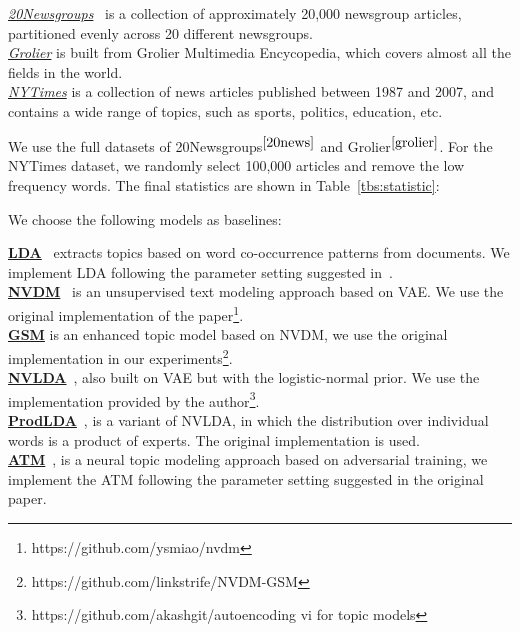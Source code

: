 \documentclass[11pt,a4paper]{article}
\begin{document}
\noindent\emph{\underline{20Newsgroups}}~\cite{Lang95} is a collection of approximately 20,000 newsgroup articles, partitioned evenly across 20 different newsgroups.  \\
\noindent\underline{\emph{Grolier}} is built from Grolier Multimedia Encycopedia, which covers almost all the fields in the world.\\
\noindent\underline{\emph{NYTimes}} is a collection of news articles published between 1987 and 2007, and contains a wide range of topics, such as sports, politics, education, etc.

We use the full datasets of 20Newsgroups$^{\ref{20news}}$ and Grolier$^{\ref{grolier}}$. For the NYTimes dataset, we randomly select 100,000 articles and remove the low frequency words. The final statistics are shown in Table~\ref{tbs:statistic}:

\begin{table}[h]
\centering
\small
{}
\caption{The statistics of datasets.}
\label{tbs:statistic}
\end{table}

We choose the following models as baselines:

\noindent\underline{\textbf{LDA}}~\cite{blei2003latent} extracts topics based on word co-occurrence patterns from documents. We implement LDA following the parameter setting suggested in~\cite{griffiths2004finding}.\\
\noindent\underline{\textbf{NVDM}}~\cite{miao2016neural} is an unsupervised text modeling approach based on VAE. We use the original implementation of the paper\footnote{https://github.com/ysmiao/nvdm}.\\
{\color{black}\noindent\underline{\textbf{GSM}}\cite{miao2017discovering} is an enhanced topic model based on NVDM, we use the original implementation in our experiments\footnote{https://github.com/linkstrife/NVDM-GSM}. }\\
\noindent\underline{\textbf{NVLDA}}~\cite{srivastava2017autoencoding}, also built on VAE but with the logistic-normal prior. We use the implementation provided by the author\footnote{https://github.com/akashgit/autoencoding vi for topic models\label{vae_lda}}.\\
\noindent\underline{\textbf{ProdLDA}}~\cite{srivastava2017autoencoding}, is a variant of NVLDA, in which the distribution over individual words is a product of experts. The original implementation is used. \\
{\color{black}\noindent\underline{\textbf{ATM}}~\cite{wang2019atm}, is a neural topic modeling approach based on adversarial training, we implement the ATM following the parameter setting suggested in the original paper. 
}
\end{document}
